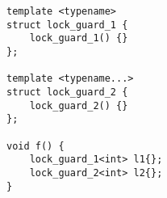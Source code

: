 \begin{lstlisting}[title=\href{https://godbolt.org/z/MKPq35}{\texttt{godbolt.org/z/MKPq35}}]
template <typename>
struct lock_guard_1 {
    lock_guard_1() {}
};

template <typename...>
struct lock_guard_2 {
    lock_guard_2() {}
};

void f() {
    lock_guard_1<int> l1{};
    lock_guard_2<int> l2{};
}
\end{lstlisting}
